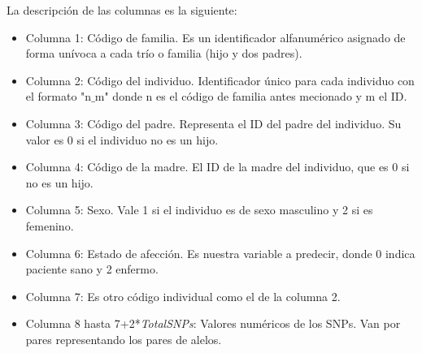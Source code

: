 La descripción de las columnas es la siguiente:
\begin{itemize}
  \item Columna 1: Código de familia. Es un identificador alfanumérico asignado de forma unívoca a cada trío o familia (hijo y dos padres).
  \item Columna 2: Código del individuo. Identificador único para cada individuo con el formato "n$\_$m" donde n es el código de familia antes mecionado y m el ID.
  \item Columna 3: Código del padre. Representa el ID del padre del individuo. Su valor es 0 si el individuo no es un hijo.
  \item Columna 4: Código de la madre. El ID de la madre del individuo, que es 0 si no es un hijo.
  \item Columna 5: Sexo. Vale 1 si el individuo es de sexo masculino y 2 si es femenino.
  \item Columna 6: Estado de afección. Es nuestra variable a predecir, donde 0 indica paciente sano y 2 enfermo.
  \item Columna 7: Es otro código individual como el de la columna 2.
  \item Columna 8 hasta 7+2*\textit{TotalSNPs}: Valores numéricos de los SNPs. Van por pares representando los pares de alelos.
  \end{itemize}


